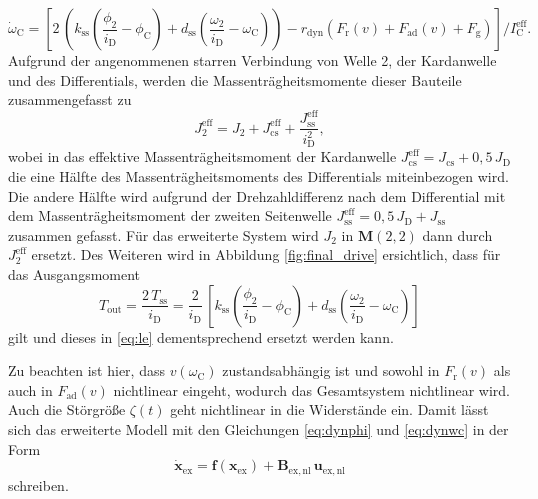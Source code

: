 \begin{equation}\label{eq:dynwc}
\dot{\omega}_\mathrm{C} = \left[ 2\,\left(k_\mathrm{ss}\left(\frac{\phi_2}{i_{\mathrm{D}}} - \phi_\mathrm{C}\right) + d_\mathrm{ss}\left(\frac{\omega_2}{i_{\mathrm{D}}} - \omega_\mathrm{C}\right)\right) - r_\mathrm{dyn}\left(F_\mathrm{r}(v) + F_\mathrm{ad}(v) + F_\mathrm{g}\right)\right]/I^\mathrm{eff}_\mathrm{C}.
\end{equation}
Aufgrund der angenommenen starren Verbindung von Welle 2, der Kardanwelle und des Differentials, werden die Massenträgheitsmomente dieser Bauteile zusammengefasst zu
\begin{equation}
J^\mathrm{eff}_2 = J_2 + J^\mathrm{eff}_\mathrm{cs} + \frac{J^\mathrm{eff}_\mathrm{ss}}{i_\mathrm{D}^2},
\end{equation}
wobei in das effektive Massenträgheitsmoment der Kardanwelle $J^\mathrm{eff}_\mathrm{cs} = J_\mathrm{cs} + 0,5\,J_\mathrm{D}$ die eine Hälfte des Massenträgheitsmoments des Differentials miteinbezogen wird. Die andere Hälfte wird aufgrund der Drehzahldifferenz nach dem Differential mit dem Massenträgheitsmoment der zweiten Seitenwelle $J^\mathrm{eff}_\mathrm{ss} =  0,5\,J_\mathrm{D} + J_\mathrm{ss}$ zusammen gefasst. Für das erweiterte System wird $J_2$ in $\pmb{M}(2,2)$ dann durch $J^\mathrm{eff}_2$ ersetzt. Des Weiteren wird in Abbildung \ref{fig:final_drive} ersichtlich, dass für das Ausgangsmoment 
\begin{equation}\label{eq:Tout}
T_\mathrm{out} = \frac{2\,T_\mathrm{ss}}{i_\mathrm{D}} = \frac{2}{i_\mathrm{D}}\,\left[ k_\mathrm{ss}\left(\frac{\phi_2}{i_{\mathrm{D}}} - \phi_\mathrm{C}\right) + d_\mathrm{ss}\left(\frac{\omega_2}{i_{\mathrm{D}}} - \omega_\mathrm{C}\right)\right]
\end{equation}
gilt und dieses in \eqref{eq:le} dementsprechend ersetzt werden kann.

Zu beachten ist hier, dass $v(\omega_\mathrm{C})$ zustandsabhängig ist und sowohl in $F_\mathrm{r}(v)$ als auch in $F_\mathrm{ad}(v)$ nichtlinear eingeht, wodurch das Gesamtsystem nichtlinear wird. Auch die Störgröße $\zeta(t)$ geht nichtlinear in die Widerstände ein. Damit lässt sich das erweiterte Modell mit 
den Gleichungen \eqref{eq:dynphi} und \eqref{eq:dynwc} in der Form 
\begin{equation}\label{eq:sys_nl}
\dot{\pmb{x}}_\mathrm{ex} = \pmb{f}(\pmb{x}_\mathrm{ex}) + \pmb{B}_\mathrm{ex,nl}\,\pmb{u}_\mathrm{ex,nl}
\end{equation}
schreiben.


